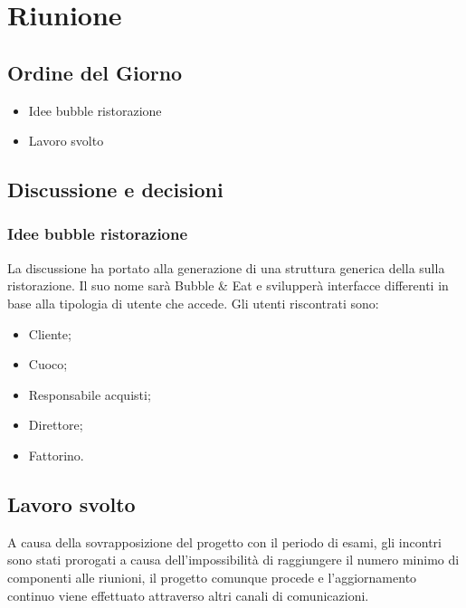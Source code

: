
\section{Riunione}
\subsection{Ordine del Giorno}
\begin{itemize}
	\item Idee bubble ristorazione
	\item Lavoro svolto
\end{itemize}

\subsection{Discussione e decisioni}
\subsubsection{Idee bubble ristorazione}
La discussione ha portato alla generazione di una struttura generica della  sulla ristorazione. Il suo nome sarà Bubble \& Eat e svilupperà interfacce differenti in base alla tipologia di utente che accede.
Gli utenti riscontrati sono:
\begin{itemize}
	\item Cliente;
	\item Cuoco;
	\item Responsabile acquisti;
	\item Direttore;
	\item Fattorino.
\end{itemize}

\subsection{Lavoro svolto}
A causa della sovrapposizione del progetto con il periodo di esami, gli incontri sono stati prorogati a causa dell'impossibilità di raggiungere il numero minimo di componenti alle riunioni, il progetto comunque procede e l'aggiornamento continuo viene effettuato attraverso altri canali di comunicazioni.
 

\clearpage
